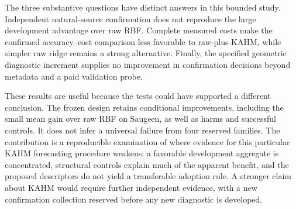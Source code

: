 The three substantive questions have distinct answers in this bounded
study. Independent natural-source confirmation does not reproduce the
large development advantage over raw RBF. Complete measured costs make
the confirmed accuracy--cost comparison less favorable to raw-plus-KAHM,
while simpler raw ridge remains a strong alternative. Finally, the
specified geometric diagnostic increment supplies no improvement in
confirmation decisions beyond metadata and a paid validation probe.

These results are useful because the tests could have supported a
different conclusion. The frozen design retains conditional improvements,
including the small mean gain over raw RBF on Saugeen, as well as harms
and successful controls. It does not infer a universal failure from four
reserved families. The contribution is a reproducible examination of
where evidence for this particular KAHM forecasting procedure weakens:
a favorable development aggregate is concentrated, structural controls
explain much of the apparent benefit, and the proposed descriptors do
not yield a transferable adoption rule. A stronger claim about KAHM
would require further independent evidence, with a new confirmation
collection reserved before any new diagnostic is developed.
